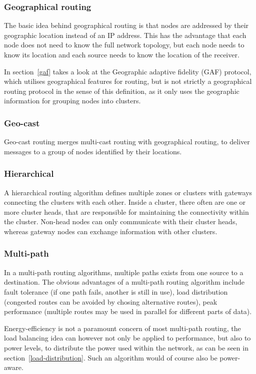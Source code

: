 \subsubsection*{Geographical routing}
The basic idea behind geographical routing is that nodes are addressed by
their geographic location instead of an IP address. This has the advantage
that each node does not need to know the full network topology, but each
node needs to know its location and each source needs to know the location
of the receiver.

In section~\ref{gaf} takes a look at the Geographic adaptive fidelity (GAF)
protocol, which utilises geographical features for routing, but is not strictly
a geographical routing protocol in the sense of this definition, as it only
uses the geographic information for grouping nodes into clusters.

\subsubsection*{Geo-cast}
Geo-cast routing merges multi-cast routing with geographical routing, to
deliver messages to a group of nodes identified by their locations.

\subsubsection*{Hierarchical}
A hierarchical routing algorithm defines multiple zones or clusters with
gateways connecting the clusters with each other. Inside a cluster, there often
are one or more cluster heads, that are responsible for maintaining the
connectivity within the cluster. Non-head nodes can only communicate with
their cluster heads, whereas gateway nodes can exchange information with
other clusters.


\subsubsection*{Multi-path}
In a multi-path routing algorithms, multiple paths exists from one source
to a destination. The obvious advantages of a multi-path routing
algorithm include fault tolerance (if one path fails, another is still in
use), load distribution (congested routes can be avoided by chosing alternative
routes), peak performance (multiple routes may be used in parallel for different
parts of data).

Energy-efficiency is not a paramount concern of most multi-path routing, the
load balancing idea can however not only be applied to performance, but also
to power levels, to distribute the power used within the network, as can be seen
in section~\ref{load-distribution}. Such an algorithm would of course also be power-aware.

